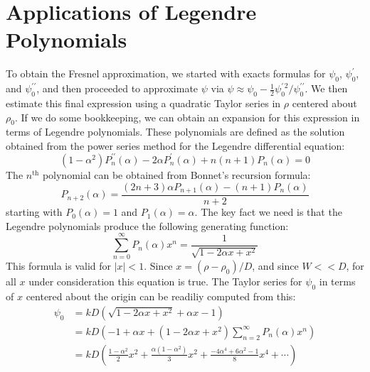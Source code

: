 \documentclass{article}
\theoremstyle{plain}
\begin{document}
    \section{Applications of Legendre Polynomials}
        To obtain the Fresnel approximation, we started with exacts formulas
        for $\psi_{0}$, $\psi^{\prime}_{0}$, and $\psi^{\prime\prime}_{0}$,
        and then proceeded to approximate $\psi$ via
        $%
            \psi\approx%
            \psi_{0}-\frac{1}{2}\psi^{\prime\,2}_{0}/\psi^{\prime\prime}_{0}%
        $.
        We then estimate this final expression using a quadratic
        Taylor series in $\rho$ centered about $\rho_{0}$. If we do some
        bookkeeping, we can obtain an expansion for this expression in terms of
        Legendre polynomials. These polynomials are defined as the
        solution obtained from the power series method for the Legendre
        differential equation:
        \begin{equation}
            (1-\alpha^{2})P^{\prime\prime}_{n}(\alpha)
            -2\alpha{P}^{\prime}_{n}(\alpha)
            +n(n+1)P_{n}(\alpha)=0
        \end{equation}
        The $n^{\textrm{th}}$ polynomial can be obtained from Bonnet's
        recursion formula:
        \begin{equation}
            P_{n+2}(\alpha)
            =\frac{(2n+3)\alpha{P}_{n+1}(\alpha)-(n+1)P_{n}(\alpha)}{n+2}
        \end{equation}
        starting with $P_{0}(\alpha)=1$ and $P_{1}(\alpha)=\alpha$.
        The key fact we need is that the Legendre polynomials produce
        the following generating function:
        \begin{equation}
            \sum_{n=0}^{\infty}P_{n}(\alpha)x^{n}
            =\frac{1}{\sqrt{1-2\alpha{x}+x^{2}}}
        \end{equation}
        This formula is valid for $|x|<1$. Since $x=(\rho-\rho_{0})/D$, and
        since $W<<D$, for all $x$ under consideration this equation is true.
        The Taylor series for $\psi_{0}$ in terms of $x$ centered about
        the origin can be readiliy computed from this:
        \begin{subequations}
            \begin{align}
                \psi_{0}
                &=kD\left(\sqrt{1-2\alpha{x}+x^{2}}+\alpha{x}-1\right)\\
                &=kD\left(
                    -1+\alpha{x}+
                    (1-2\alpha{x}+x^{2})\sum_{n=2}^{\infty}P_{n}(\alpha)x^{n}
                \right)\\
                &=kD\left(
                    \frac{1-\alpha^{2}}{2}x^{2}
                    +\frac{\alpha(1-\alpha^{2})}{3}x^{2}
                    +\frac{-4\alpha^{4}+6\alpha^{2}-1}{8}x^{4}
                    +\cdots
                \right)
            \end{align}
        \end{subequations}
\end{document}
